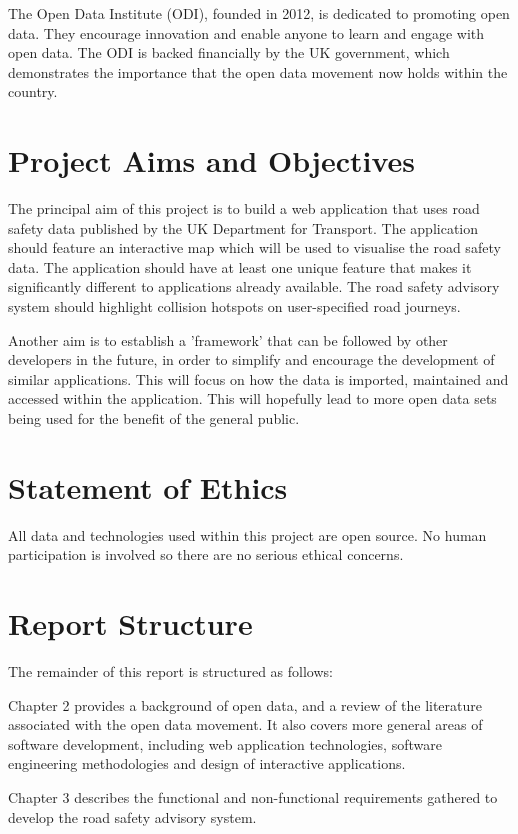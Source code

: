 \documentclass[authoryearcitations]{UoYCSproject}
\begin{document}
The Open Data Institute (ODI), founded in 2012, is dedicated to promoting open data. They encourage innovation and enable anyone to learn and engage with open data. The ODI is backed financially by the UK government, which demonstrates the importance that the open data movement now holds within the country.

\section{Project Aims and Objectives}

The principal aim of this project is to build a web application that uses road safety data published by the UK Department for Transport. The application should feature an interactive map which will be used to visualise the road safety data. The application should have at least one unique feature that makes it significantly different to applications already available. The road safety advisory system should highlight collision hotspots on user-specified road journeys.

Another aim is to establish a 'framework' that can be followed by other developers in the future, in order to simplify and encourage the development of similar applications. This will focus on how the data is imported, maintained and accessed within the application. This will hopefully lead to more open data sets being used for the benefit of the general public.

\section{Statement of Ethics}
All data and technologies used within this project are open source. No human participation is involved so there are no serious ethical concerns.

\section{Report Structure}
The remainder of this report is structured as follows:

Chapter 2 provides a background of open data, and a review of the literature associated with the open data movement. It also covers more general areas of software development, including web application technologies, software engineering methodologies and design of interactive applications.

Chapter 3 describes the functional and non-functional requirements gathered to develop the road safety advisory system.
\end{document}
